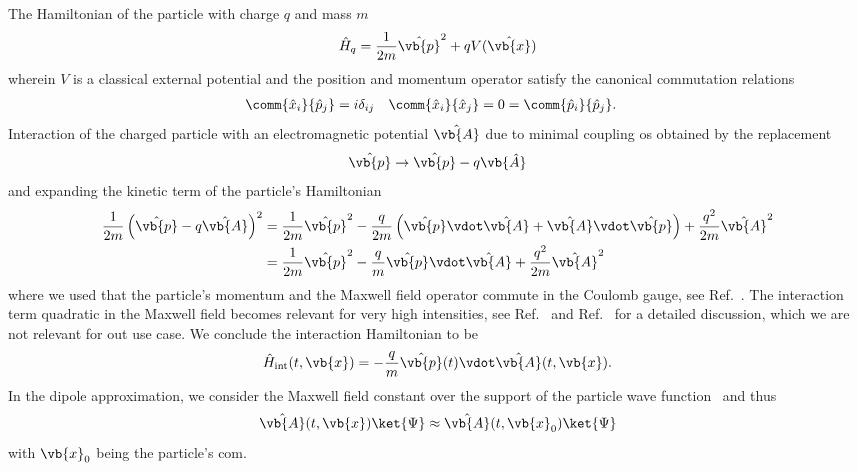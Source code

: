 The Hamiltonian of the particle with charge $q$ and mass $m$
\begin{equation}
	\hat{H}_q
	=
	\frac{1}{2m}
	\hat{\vb{p}}^2
	+
	qV(\hat{\vb{x}})
\end{equation}
wherein $V$ is a classical external potential and the position and momentum operator satisfy the canonical commutation relations
\begin{align}
	\comm{\hat{x}_i}{\hat{p}_j}
	&=
	i\delta_{ij}
	&
	\comm{\hat{x}_i}{\hat{x}_j}
	&=
	0
	=
	\comm{\hat{p}_i}{\hat{p}_j}
	.
\end{align}
Interaction of the charged particle with an electromagnetic potential $\hat{\vb{A}}$ due to minimal coupling os obtained by the replacement~\cite{Itzykson2012}
\begin{equation}
	\hat{\vb{p}}
	\to
	\hat{\vb{p}}
	-
	q\vb{\hat{A}}
\end{equation}
and expanding the kinetic term of the particle's Hamiltonian
\begin{equation}
	\begin{split}
		\frac{1}{2m}
		\left(\hat{\vb{p}}-q\hat{\vb{A}}\right)^2
		&=
		\frac{1}{2m}
		\hat{\vb{p}}^2
		-
		\frac{q}{2m}
		\left(
			\hat{\vb{p}}
			\vdot
			\hat{\vb{A}}
			+
			\hat{\vb{A}}
			\vdot
			\hat{\vb{p}}
		\right)
		+
		\frac{q^2}{2m}
		\hat{\vb{A}}^2
		\\
		&=
		\frac{1}{2m}
		\hat{\vb{p}}^2
		-
		\frac{q}{m}
		\hat{\vb{p}}
		\vdot
		\hat{\vb{A}}
		+
		\frac{q^2}{2m}
		\hat{\vb{A}}^2
	\end{split}
\end{equation}
where we used that the particle's momentum and the Maxwell field operator commute in the Coulomb gauge, see Ref.~\cite[p.~687]{Mandel1995}.
The interaction term quadratic in the Maxwell field becomes relevant for very high intensities, see Ref.~\cite[p.~198]{Cohen1989} and Ref.~\cite[p.~689]{Mandel1995} for a detailed discussion, which we are not relevant for out use case.
We conclude the interaction Hamiltonian to be
\begin{equation}
	\hat{H}_\text{int}(t,\vb{x})
	=
	-\frac{q}{m}
	\hat{\vb{p}}(t)
	\vdot
	\hat{\vb{A}}(t,\vb{x})
	.
\end{equation}
In the dipole approximation, we consider the Maxwell field constant over the support of the particle wave function~\cite[p.~688]{Mandel1995} and thus
\begin{equation}
	\hat{\vb{A}}(t,\vb{x})
	\ket{\Psi}
	\approx
	\hat{\vb{A}}(t,\vb{x}_0)
	\ket{\Psi}
\end{equation}
with $\vb{x}_0$ being the particle's \gls{com}.

